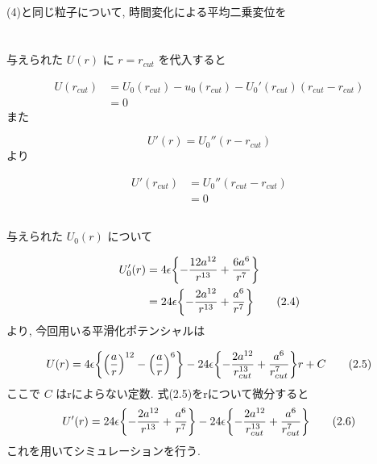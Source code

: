\documentclass[a4paper,dvipdfmx]{jarticle}
\begin{document}
\subsection{}
\noindent
(4)と同じ粒子について, 時間変化による平均二乗変位を


\section{}
\subsection{}
\noindent
与えられた $U(r)$ に $r=r_{cut}$ を代入すると

\begin{align*}
    U(r_{cut}) &= U_0(r_{cut}) - u_0(r_{cut}) - U_0'(r_{cut}) (r_{cut} - r_{cut}) \\
    &= 0 \tag{2.1}
\end{align*}
また

\begin{equation}
    U'(r) = U_0''(r - r_{cut}) \tag{2.2}
\end{equation}
より

\begin{align*}
    U'(r_{cut}) &= U_0''(r_{cut} - r_{cut}) \\
    &= 0 \tag{2.3}
\end{align*}

\subsection{}
\noindent
与えられた $U_0(r)$ について

\begin{align*}
    U_0'(r) &= 4 \epsilon \qty{-\frac{12a^{12}}{r^{13}} + \frac{6a^6}{r^7}} \\ 
    &= 24 \epsilon \qty{-\frac{2a^{12}}{r^{13}} + \frac{a^6}{r^7}} \tag{2.4}
\end{align*}
より, 今回用いる平滑化ポテンシャルは

\begin{equation}
    U(r) = 4 \epsilon \qty{\qty(\frac{a}{r})^{12} - \qty(\frac{a}{r})^6}
    - 24 \epsilon \qty{-\frac{2a^{12}}{r_{cut}^{13}} + \frac{a^6}{r_{cut}^7}} r
    + C \tag{2.5}
\end{equation}
ここで $C$ はrによらない定数. 
式(2.5)をrについて微分すると
\begin{equation}
    U'(r) = 24 \epsilon \qty{-\frac{2a^{12}}{r^{13}} + \frac{a^6}{r^7}}
    - 24 \epsilon \qty{-\frac{2a^{12}}{r_{cut}^{13}} + \frac{a^6}{r_{cut}^7}} 
    \tag{2.6}
\end{equation}
これを用いてシミュレーションを行う.
\end{document}
